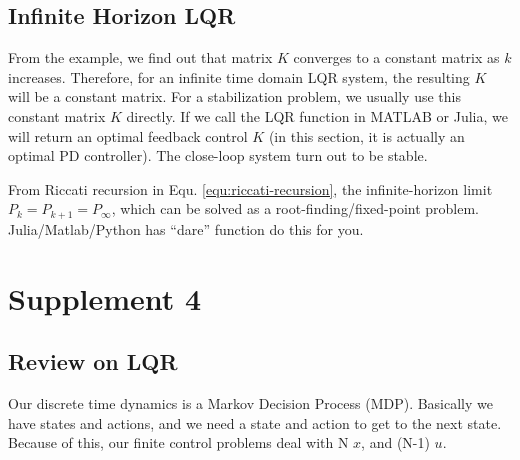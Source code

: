 \subsection{Infinite Horizon LQR}
From the example, we find out that matrix $K$ converges to a constant matrix as $k$ increases. Therefore, for an infinite time domain LQR system, the resulting $K$ will be a constant matrix. For a stabilization problem, we usually use this constant matrix $K$ directly. If we call the LQR function in MATLAB or Julia, we will return an optimal feedback control $K$ (in this section, it is actually an optimal PD controller). The close-loop system turn out to be stable.

From Riccati recursion in Equ. \eqref{equ:riccati-recursion}, the infinite-horizon limit $P_{k} = P_{k+1} = P_{\infty}$, which can be solved as a root-finding/fixed-point problem. Julia/Matlab/Python has ``dare'' function do this for you.

\section{Supplement 4}
\subsection{Review on LQR}
Our discrete time dynamics is a Markov Decision Process (MDP). Basically we have states and actions, and we need a state and action to get to the next state. Because of this, our finite control problems deal with N $x$, and (N-1) $u$.

